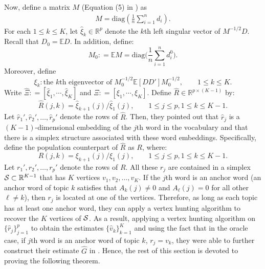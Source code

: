 \documentclass[preprint,11pt]{article}
\numberwithin{equation}{section}
\newcommand{\diag}{\mathrm{diag}}
\begin{document}
Now, define a matrix $M$ (Equation (5) in \cite{ke2024entry}) as 
\begin{align*}
    M = \diag\left(\frac{1}{n}\sum_{i=1}^nd_i\right).
\end{align*}
For each $1\leq k\leq K$, let $\hat{\xi}_k\in\mathbb{R}^p$ denote the $k$th left singular vector of $M^{-1/2}D$. Recall that $D_0=\mathbb{E}D$. In addition, define:
\begin{equation*} 
M_0: = \mathbb {E} M  = \mathrm{diag}\biggl(\frac{1}{n}\sum_{i=1}^nd_i^0 \biggr). 
\end{equation*}
Moreover, define
\begin{equation*}
\xi_k: \mbox{the $k$th eigenvector of } M_0^{-1/2}\mathbb{E}[DD']M_0^{-1/2}, \qquad 1\leq k\leq K. 
\end{equation*}
Write $\hat \Xi : = [\hat \xi_1, \cdots, \hat \xi_K]$ and $\Xi: = [\xi_1, \cdots,  \xi_K]$. Define $\hat{R}\in\mathbb{R}^{p\times (K-1)}$ by:
\begin{equation} \label{SCORE}
\hat{R}(j,k) = \hat{\xi}_{k+1}(j)/\hat{\xi}_1(j), \qquad 1\leq j\leq p, 1\leq k\leq K-1. 
\end{equation}
Let $\hat{r}_1',\hat{r}_2',\ldots,\hat{r}_p'$ denote the rows of $\hat{R}$. Then, they pointed out that $\hat{r}_j$ is a $(K-1)$-dimensional embedding of the $j$th word in the vocabulary and that there is a simplex structure associated with these word embeddings. Specifically, define the population counterpart of $\hat{R}$ as $R$, where:
\begin{equation*}
R(j,k) = \xi_{k+1}(j)/\xi_1(j), \qquad 1\leq j\leq p, 1\leq k\leq K-1. 
\end{equation*}
Let $r_1', r_2',\ldots, r_p'$ denote the rows of $R$. All these $r_j$ are contained in a simplex ${\cal S}\subset\mathbb{R}^{K-1}$ that has $K$ vertices $v_1, v_2, \ldots, v_K$.  
If the $j$th word is an anchor word (an anchor word of topic $k$ satisfies that $A_k(j)\neq 0$ and $A_\ell(j)=0$ for all other $\ell\neq k$), then $r_j$ is located at one of the vertices. Therefore, as long as each topic has at least one anchor word, they can apply a vertex hunting algorithm to recover the $K$ vertices of ${\cal S}$. As a result, applying a vertex hunting algorithm on $\{\hat{r}_j\}_{j=1}^p$ to obtain the estimates $\{\hat{v}_k\}_{k=1}^K$ and using the fact that in the oracle case, if $j$th word is an anchor word of topic $k$, $r_j = v_k$, they were able to further construct their estimate $\widehat{G}$ in \cite{ke2024entry}. Hence, the rest of this section is devoted to proving the following theorem.
\end{document}

